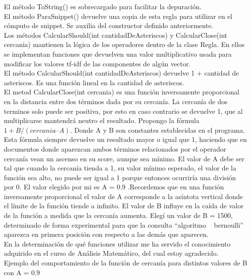 \documentclass{article}
\begin{document}
El método ToString() es sobrecargado para facilitar la depuración.\\
El método ParaSnippet() devuelve una copia de esta regla para utilizar en el cómputo de snippet. Se auxilia del constructor definido anteriormente.\\
Los métodos CalcularShould(int cantidadDeAsteriscos) y CalcularClose(int cercania) mantienen la lógica de los operadores dentro de la clase Regla. En ellos se implementan funciones que devuelven una valor multiplicativo usada para modificar los valores tf-idf de las componentes de algún vector.\\
El método CalcularShould(int cantidadDeAsteriscos) devuelve 1 + cantidad de asteriscos. Es una función lineal en la cantidad de asteriscos.\\
El metod CalcularClose(int cercania) es una función inversamente proporcional en la distancia entre dos términos dada por su cercanía. La cercanía de dos terminos solo puede ser positiva, por esto en caso contrario se devuelve 1, que al multiplicarse mantendrá neutro el resultado. Propongo la fórmula $1 + B / (cercania – A)$. Donde A y B son constantes establecidas en el programa. Esta fórmula siempre devuelve un resultado mayor o igual que 1, haciendo que en documentos donde aparezcan ambos términos relacionados por el operador cercanía vean un ascenso en su score, aunque sea mínimo. El valor de A debe ser tal que cuando la cercanía tienda a 1, su valor mínimo esperado, el valor de la función sea alto, no puede ser igual a 1 porque entonces ocurriría una división por 0. El valor elegido por mi es A = 0.9 .Recordemos que en una función inversamente proporcional el valor de A corresponde a la asíntota vertical donde el límite de la función tiende a infinito. El valor de B influye en la caída de valor de la función a medida que la cercanía aumenta. Elegí un valor de B = 1500, determinado de forma experimental para que la consulta “algoritmo ~ bernoulli” aparezca en primera posición con respecto a las demás que aparecen.\\
En la determinación de qué funciones utilizar me ha servido el conocimiento adquirido en el curso de Análisis Matemático, del cual estoy agradecido.\\
Ejemplo del comportamiento de la función de cercanía para distintos valores de B con A  = 0.9\\
\end{document}
